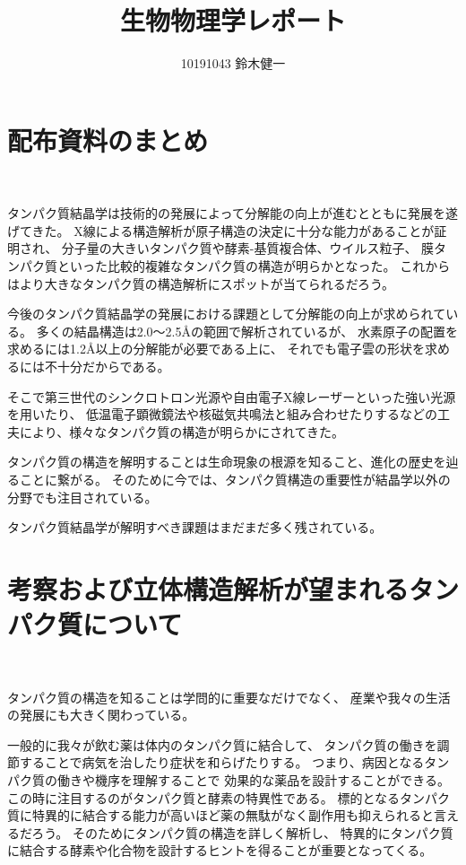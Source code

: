 \documentclass[a4paper,papersize,dvipdfmx]{jsarticle}
\begin{document}
\title{生物物理学レポート}
\author{10191043 鈴木健一}
\date{}
\maketitle

\large

\vspace*{40pt}

\section*{配布資料のまとめ}

\

タンパク質結晶学は技術的の発展によって分解能の向上が進むとともに発展を遂げてきた。
X線による構造解析が原子構造の決定に十分な能力があることが証明され、
分子量の大きいタンパク質や酵素-基質複合体、ウイルス粒子、
膜タンパク質といった比較的複雑なタンパク質の構造が明らかとなった。
これからはより大きなタンパク質の構造解析にスポットが当てられるだろう。

今後のタンパク質結晶学の発展における課題として分解能の向上が求められている。
多くの結晶構造は2.0〜2.5Åの範囲で解析されているが、
水素原子の配置を求めるには1.2Å以上の分解能が必要である上に、
それでも電子雲の形状を求めるには不十分だからである。

そこで第三世代のシンクロトロン光源や自由電子X線レーザーといった強い光源を用いたり、
低温電子顕微鏡法や核磁気共鳴法と組み合わせたりするなどの工夫により、様々なタンパク質の構造が明らかにされてきた。

タンパク質の構造を解明することは生命現象の根源を知ること、進化の歴史を辿ることに繋がる。
そのために今では、タンパク質構造の重要性が結晶学以外の分野でも注目されている。

タンパク質結晶学が解明すべき課題はまだまだ多く残されている。

\vspace*{40pt}

\section*{考察および立体構造解析が望まれるタンパク質について}

\

タンパク質の構造を知ることは学問的に重要なだけでなく、
産業や我々の生活の発展にも大きく関わっている。

一般的に我々が飲む薬は体内のタンパク質に結合して、
タンパク質の働きを調節することで病気を治したり症状を和らげたりする。
つまり、病因となるタンパク質の働きや機序を理解することで
効果的な薬品を設計することができる。
この時に注目するのがタンパク質と酵素の特異性である。
標的となるタンパク質に特異的に結合する能力が高いほど薬の無駄がなく副作用も抑えられると言えるだろう。
そのためにタンパク質の構造を詳しく解析し、
特異的にタンパク質に結合する酵素や化合物を設計するヒントを得ることが重要となってくる。
\end{document}
